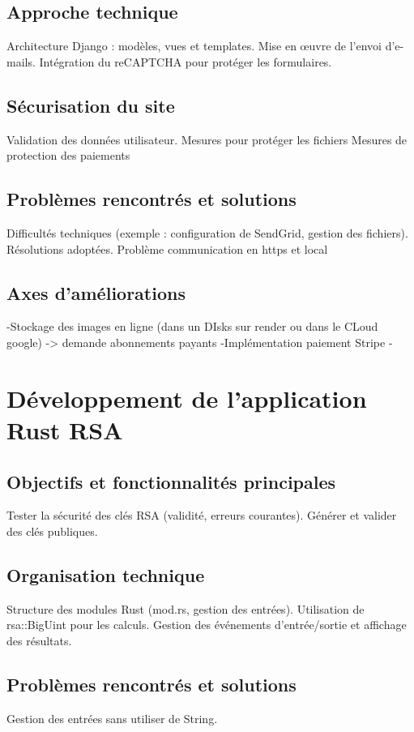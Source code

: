 \documentclass[12pt]{article} %
\begin{document}
	\subsection{Approche technique}
		Architecture Django : modèles, vues et templates.
Mise en œuvre de l’envoi d’e-mails.
Intégration du reCAPTCHA pour protéger les formulaires.
		
		
	\subsection{Sécurisation du site}
		Validation des données utilisateur.
Mesures pour protéger les fichiers 
Mesures de protection des paiements


	\subsection{Problèmes rencontrés et solutions}
		Difficultés techniques (exemple : configuration de SendGrid, gestion des fichiers).
Résolutions adoptées.
Problème communication en https et local


	\subsection{Axes d'améliorations}
		-Stockage des images en ligne (dans un DIsks sur render ou dans le CLoud google) -> demande abonnements payants
		-Implémentation paiement Stripe
		-
		

	

\section{Développement de l'application Rust RSA}
	\subsection{Objectifs et fonctionnalités principales}
		Tester la sécurité des clés RSA (validité, erreurs courantes).
Générer et valider des clés publiques.

	\subsection{Organisation technique}
		Structure des modules Rust (mod.rs, gestion des entrées).
Utilisation de rsa::BigUint pour les calculs.
Gestion des événements d’entrée/sortie et affichage des résultats.

	\subsection{Problèmes rencontrés et solutions}
		Gestion des entrées sans utiliser de String.
\end{document}
